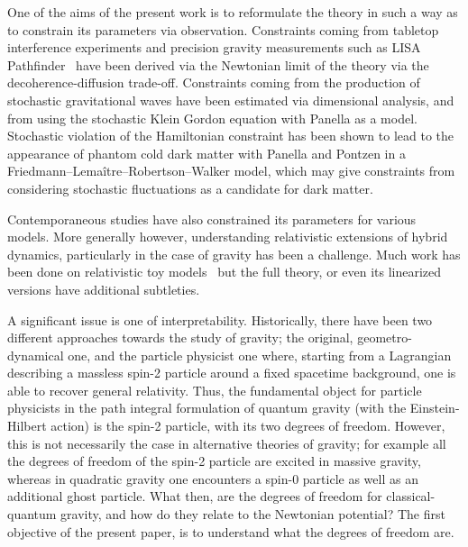 \documentclass[aps,preprintnumbers,superscriptaddress,longbibliography]{revtex4-1}
\begin{document}
One of the aims of the present work is to reformulate the theory in such a way as to constrain its parameters via observation. Constraints coming from tabletop interference experiments\cite{gerlich2011quantum} and precision gravity measurements such as LISA Pathfinder~\cite{armano2024indepth,janse2024current} have been derived via the Newtonian limit of the theory\cite{oppenheim2023gravitationally,layton2023weak,grudka2024renormalisation} via the decoherence-diffusion trade-off. Constraints coming from the production of stochastic gravitational waves have been estimated via dimensional analysis\cite{penington2024}, and from using the stochastic Klein Gordon equation with Panella as a model\cite{oppenheim2025diffusion}. Stochastic violation of the Hamiltonian constraint has been shown to lead to the appearance of phantom cold dark matter with Panella and Pontzen in a Friedmann–Lemaître–Robertson–Walker model\cite{oppenheim2024emergence}, which may give constraints from considering stochastic fluctuations as a candidate for dark matter. 

Contemporaneous studies \cite{hirotani2026testing,fabiano2026minimal} have also constrained its parameters for various models.
%
More generally however, understanding relativistic extensions of hybrid dynamics, particularly in the case of gravity has been a challenge. Much work has been done on relativistic toy models~\cite{oppenheim2023covariant,oppenheim2024diffeomorphism,diosi2022there, grudka2024renormalisation,carney2024classicalquantum} but the full theory, or even its linearized versions have additional subtleties.

A significant issue is one of interpretability. Historically, there have been two different approaches towards the study of gravity; the original, geometro-dynamical one, and the particle physicist one  where, starting from a Lagrangian describing a massless spin-2 particle around a fixed spacetime background, one is able to recover general relativity. Thus, the fundamental object for particle physicists in the path integral formulation of quantum gravity (with the Einstein-Hilbert action) is the spin-2 particle, with its two degrees of freedom. However, this is not necessarily the case in alternative theories of gravity; for example all the degrees of freedom of the spin-2 particle are excited in massive gravity, whereas in quadratic gravity one encounters a spin-0 particle as well as an additional ghost
particle. What then, are the degrees of freedom for classical-quantum gravity, and how do they relate to the Newtonian potential? The first objective of the present paper, is to understand what the degrees of freedom are.
\end{document}
